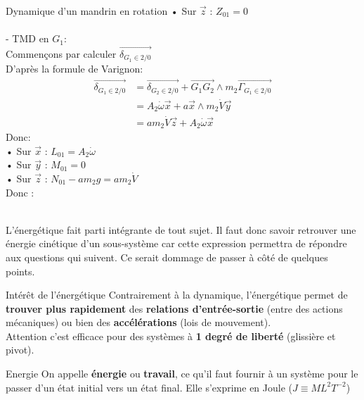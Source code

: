 \documentclass{article} %
\begin{document}
{\begin{exemple}{Dynamique d'un mandrin en rotation}
\hspace*{7pt}• Sur $\vec{z}$ : $Z_{01} = 0$\\
\\
- TMD en $G_1$:\\
Commençons par calculer $\overrightarrow{\delta_{G_1 \in 2/0}}$\\
D'après la formule de Varignon:
\begin{align*}
\overrightarrow{\delta_{G_1 \in 2/0}} &= \overrightarrow{\delta_{G_2 \in 2/0}} + \overrightarrow{G_1 G_2} \wedge m_2 \overrightarrow{\Gamma_{G_1 \in 2/0}}\\
&= A_2 \dot{\omega} \vec{x} + a \vec{x} \wedge m_2 \dot{V} \vec{y}\\
&= a m_2 \dot{V} \vec{z} + A_2 \dot{\omega} \vec{x}
\end{align*}
Donc:\\
\hspace*{7pt}• Sur $\vec{x}$ : $L_{01} = A_2 \dot{\omega}$\\
\hspace*{7pt}• Sur $\vec{y}$ : $M_{01} = 0$\\
\hspace*{7pt}• Sur $\vec{z}$ : $N_{01} - a m_2 g = a m_2 \dot{V}$\\
Donc : 
\end{exemple}\pagebreak
{}
{}
\vspace*{4pt}\\
L'énergétique fait parti intégrante de tout sujet. Il faut donc savoir retrouver une énergie cinétique d'un sous-système car cette expression permettra de répondre aux questions qui suivent. Ce serait dommage de passer à côté de quelques points.
\begin{propriété}{Intérêt de l'énergétique}
Contrairement à la dynamique, l'énergétique permet de \textbf{trouver plus rapidement} des \textbf{relations d'entrée-sortie} (entre des actions mécaniques) ou bien des \textbf{accélérations} (lois de mouvement).\\
Attention c'est efficace pour des systèmes à \textbf{1 degré de liberté} (glissière et pivot).
\end{propriété}
\begin{definition}{Energie}
On appelle \textbf{énergie} ou \textbf{travail}, ce qu'il faut fournir à un système pour le passer d'un état initial vers un état final. Elle s'exprime en Joule ($J\equiv ML^2T^{-2}$)

\end{definition}}
\end{document}
